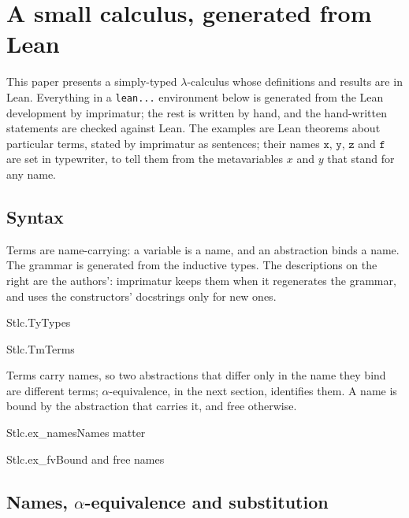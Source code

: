 \documentclass{article}
\begin{document}
\section{A small calculus, generated from Lean}

This paper presents a simply-typed $\lambda$-calculus whose definitions and
results are in Lean. Everything in a \texttt{lean...} environment below is
generated from the Lean development by imprimatur; the rest is written by
hand, and the hand-written statements are checked against Lean. The
examples are Lean theorems about particular terms, stated by imprimatur as
sentences; their names $\mathtt{x}$, $\mathtt{y}$, $\mathtt{z}$ and
$\mathtt{f}$ are set in typewriter, to tell them from the metavariables $x$
and $y$ that stand for any name.

\subsection{Syntax}

Terms are name-carrying: a variable is a name, and an abstraction binds a
name. The grammar is generated from the inductive types. The descriptions on
the right are the authors': imprimatur keeps them when it regenerates the
grammar, and uses the constructors' docstrings only for new ones.

\begin{leangrammar}{Stlc.Ty}{Types}
\end{leangrammar}

\begin{leangrammar}{Stlc.Tm}{Terms}
\end{leangrammar}

Terms carry names, so two abstractions that differ only in the name they bind
are different terms; $\alpha$-equivalence, in the next section, identifies
them. A name is bound by the abstraction that carries it, and free otherwise.

\begin{leanexample}{Stlc.ex_names}{Names matter}
\end{leanexample}

\begin{leanexample}{Stlc.ex_fv}{Bound and free names}
\end{leanexample}

\subsection{Names, \texorpdfstring{$\alpha$}{α}-equivalence and substitution}
\end{document}
